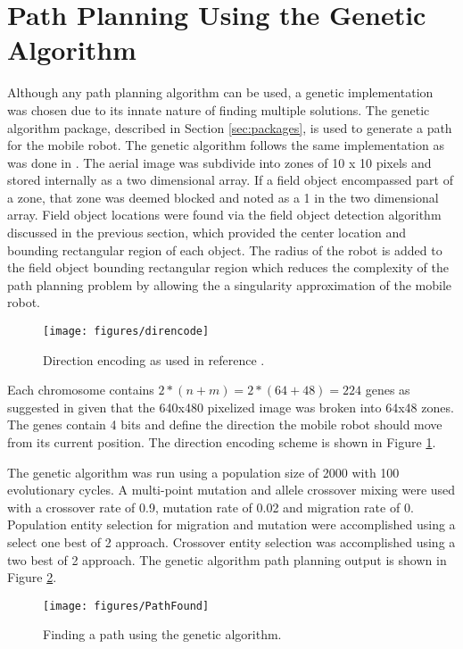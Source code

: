   \section{Path Planning Using the Genetic Algorithm}
    Although any path planning algorithm can be used, a genetic
      implementation was chosen due to its innate nature of 
      finding multiple solutions.
    The genetic algorithm package, described in Section \ref{sec:packages}, is 
      used to generate a path for the mobile robot.
    The genetic algorithm follows the same implementation as was done in 
      \cite{Tu2003}.
    The aerial image was subdivide into zones of 10 x 10 pixels and stored 
      internally as a two dimensional array.
    If a field object encompassed part of a zone, that zone was deemed blocked 
      and noted as a 1 in the two dimensional array.
    Field object locations were found via the field object detection algorithm 
      discussed in the previous section, which provided the center location and 
      bounding rectangular region of each object.
    The radius of the robot is added to the field object bounding rectangular 
      region which reduces the complexity of the path planning problem by 
      allowing the a singularity approximation of the mobile robot.

    \begin{figure}%
    \begin{center}
    \texttt{[image: figures/direncode]}
    \caption{Direction encoding as used in reference \cite{Tu2003}.}
    \label{fig:direncode}
    \end{center}
    \end{figure}

    Each chromosome contains $2*(n+m)=2*(64+48)=224$ genes as suggested in 
      \cite{Tu2003} given that the 640x480 pixelized image was broken into 
      64x48 zones.
    The genes contain 4 bits and define the direction the mobile robot should 
      move from its current position.
    The direction encoding scheme is shown in Figure \ref{fig:direncode}.

    The genetic algorithm was run using a population size of 2000 with 100 
      evolutionary cycles.
    A multi-point mutation and allele crossover mixing were used with a 
      crossover rate of 0.9, mutation rate of 0.02 and migration rate of 0.
    Population entity selection for migration and mutation were accomplished 
      using a select one best of 2 approach.
    Crossover entity selection was accomplished using a two best of 2 approach.
    The genetic algorithm path planning output is shown in Figure 
    \ref{fig:path}.
    \begin{figure}%
    \begin{center}
    \texttt{[image: figures/PathFound]}
    \caption{Finding a path using the genetic algorithm.}
    \label{fig:path}
    \end{center}
    \end{figure}

